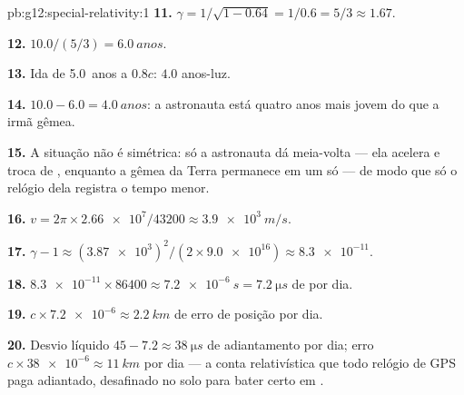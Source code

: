 \begin{solution}{pb:g12:special-relativity:1}
\textbf{11.} $\gamma = 1/\sqrt{1 - 0.64} = 1/0.6 = 5/3 \approx 1.67$.

\textbf{12.} $10.0/(5/3) = \qty{6.0}{anos}$.

\textbf{13.} Ida de \qty{5.0}{anos} a $0.8c$: $4.0$ anos-luz.

\textbf{14.} $10.0 - 6.0 = \qty{4.0}{anos}$: a astronauta está quatro
anos mais jovem do que a irmã gêmea.

\textbf{15.} A situação não é simétrica: só a astronauta dá meia-volta ---
ela acelera e troca de , enquanto a gêmea da Terra
permanece em um só --- de modo que só o relógio dela registra o tempo
menor.

\textbf{16.} $v = 2\pi \times \num{2.66e7}/\num{43200} \approx
\qty{3.9e3}{m/s}$.

\textbf{17.} $\gamma - 1 \approx (\num{3.87e3})^2/(2 \times \num{9.0e16})
\approx \num{8.3e-11}$.

\textbf{18.} $\num{8.3e-11} \times \num{86400} \approx \qty{7.2e-6}{s} =
\qty{7.2}{\micro s}$ de  por dia.

\textbf{19.} $c \times \num{7.2e-6} \approx \qty{2.2}{km}$ de erro de
posição por dia.

\textbf{20.} Desvio líquido $45 - 7.2 \approx \qty{38}{\micro s}$ de
adiantamento por dia; erro
$c \times \num{38e-6} \approx \qty{11}{km}$ por dia --- a conta
relativística que todo relógio de GPS paga adiantado, desafinado no solo
para bater certo em .
\end{solution}
